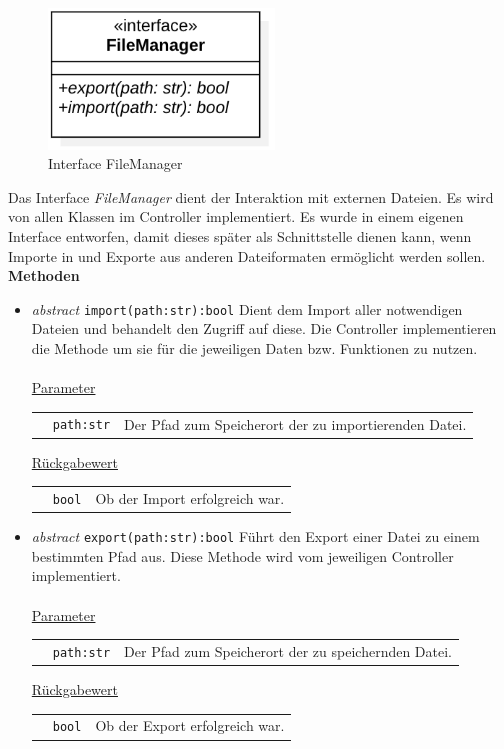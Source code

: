 \documentclass{article}
\begin{document}
\begin{figure}[H]%
    \centering
    \includegraphics[width=6cm]{entwurf/Floriane/FileManager.png}
    \caption{Interface FileManager}
\end{figure}

Das Interface \textit{FileManager} dient der Interaktion mit externen Dateien. Es wird von allen Klassen im Controller implementiert. Es wurde in einem eigenen Interface entworfen, damit dieses später als Schnittstelle dienen kann, wenn Importe in und Exporte aus anderen Dateiformaten ermöglicht werden sollen.
\newline \newline
\textbf{{Methoden}}
\begin{itemize}
\item \textit{\flqq{}abstract\frqq} \texttt{import(path:str):bool} \newline Dient dem Import aller notwendigen Dateien und behandelt den Zugriff auf diese. Die Controller implementieren die Methode um sie für die jeweiligen Daten bzw. Funktionen zu nutzen.
\\\\
\underline{{Parameter}}

\begin{tabular}{lll}
 & \texttt{path:str} & Der Pfad zum Speicherort der zu importierenden Datei. \\
\end{tabular}

\underline{{Rückgabewert}}

\begin{tabular}{lll}
 & \texttt{bool} & Ob der Import erfolgreich war. \\
\end{tabular}

\item \textit{\flqq{}abstract\frqq} \texttt{export(path:str):bool} \newline Führt den Export einer Datei zu einem bestimmten Pfad aus. Diese Methode wird vom jeweiligen Controller implementiert.
\\\\
\underline{{Parameter}}

\begin{tabular}{lll}
 & \texttt{path:str} & Der Pfad zum Speicherort der zu speichernden Datei. \\
\end{tabular}

\underline{{Rückgabewert}}

\begin{tabular}{lll}
 & \texttt{bool} & Ob der Export erfolgreich war. \\
\end{tabular}
\end{itemize}
\end{document}
